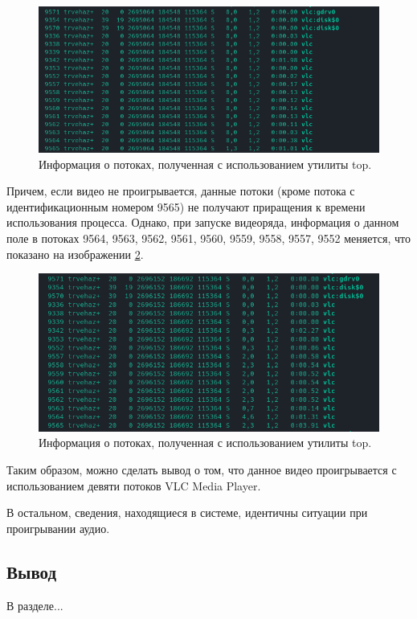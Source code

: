 \begin{figure}[H]
	\centering
	\includegraphics[scale=0.8]{img/vlcThreads.png}
	\caption{Информация о потоках, полученная с использованием утилиты top. }
	\label{fig:vlcThreads}
\end{figure}

Причем, если видео не проигрывается, данные потоки (кроме потока с идентификационным номером 9565) не получают приращения к времени использования процесса. Однако, при запуске видеоряда, информация о данном поле в потоках 9564, 9563, 9562, 9561, 9560, 9559, 9558, 9557, 9552 меняется, что показано на изображении \ref{fig:vlcThreadsAfter}.

\begin{figure}[H]
	\centering
	\includegraphics[scale=0.8]{img/vlcThreadsAfter.png}
	\caption{Информация о потоках, полученная с использованием утилиты top. }
	\label{fig:vlcThreadsAfter}
\end{figure}

Таким образом, можно сделать вывод о том, что данное видео проигрывается с использованием девяти потоков VLC Media Player.

В остальном, сведения, находящиеся в системе, идентичны ситуации при проигрывании аудио.

\subsection*{Вывод}
В разделе...
